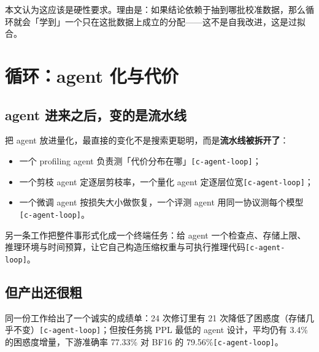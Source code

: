 本文认为这应该是硬性要求。理由是：如果结论依赖于抽到哪批校准数据，那么循环就会「学到」一个只在这批数据上成立的分配——这不是自我改进，这是过拟合。


\section{循环：agent 化与代价}

\subsection{agent 进来之后，变的是流水线}

把 agent 放进量化，最直接的变化不是搜索更聪明，而是\textbf{流水线被拆开了}：


\begin{itemize}
  \item 一个 profiling agent 负责测「代价分布在哪」{\scriptsize\texttt{[c-\hspace{0pt}agent-\hspace{0pt}loop]}}；
  \item 一个剪枝 agent 定逐层剪枝率，一个量化 agent 定逐层位宽{\scriptsize\texttt{[c-\hspace{0pt}agent-\hspace{0pt}loop]}}；
  \item 一个微调 agent 按损失大小做恢复，一个评测 agent 用同一协议测每个模型{\scriptsize\texttt{[c-\hspace{0pt}agent-\hspace{0pt}loop]}}。
\end{itemize}

另一条工作把整件事形式化成一个终端任务：给 agent 一个检查点、存储上限、推理环境与时间预算，让它自己构造压缩权重与可执行推理代码{\scriptsize\texttt{[c-\hspace{0pt}agent-\hspace{0pt}loop]}}。


\subsection{但产出还很粗}

同一份工作给出了一个诚实的成绩单：24 次修订里有 21 次降低了困惑度（存储几乎不变）{\scriptsize\texttt{[c-\hspace{0pt}agent-\hspace{0pt}loop]}}；但按任务挑 PPL 最低的 agent 设计，平均仍有 3.4\% 的困惑度增量，下游准确率 77.33\% 对 BF16 的 79.56\%{\scriptsize\texttt{[c-\hspace{0pt}agent-\hspace{0pt}loop]}}。


